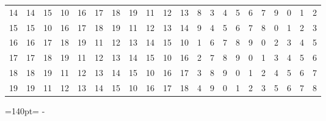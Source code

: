 \documentclass[10pt,a4paper]{article}
\newcommand{\needspace}[1]{\par\penalty-100\begingroup\dimen0=#1\relax\dimen2=\pagegoal
  \advance\dimen2-\pagetotal\ifdim\dimen0>\dimen2\relax\ifdim\dimen2>0pt\vfil\break\fi\fi
  \endgroup}
\numberwithin{equation}{section}
\begin{document}
{\begin{longtable}{@{}r|rrrrrrrrrrrrrrrrrrrr@{}}
14 & 14 & 15 & 10 & 16 & 17 & 18 & 19 & 11 & 12 & 13 & 8 & 3 & 4 & 5 & 6 & 7 & 9 & 0 & 1 & 2\\
15 & 15 & 10 & 16 & 17 & 18 & 19 & 11 & 12 & 13 & 14 & 9 & 4 & 5 & 6 & 7 & 8 & 0 & 1 & 2 & 3\\
16 & 16 & 17 & 18 & 19 & 11 & 12 & 13 & 14 & 15 & 10 & 1 & 6 & 7 & 8 & 9 & 0 & 2 & 3 & 4 & 5\\
17 & 17 & 18 & 19 & 11 & 12 & 13 & 14 & 15 & 10 & 16 & 2 & 7 & 8 & 9 & 0 & 1 & 3 & 4 & 5 & 6\\
18 & 18 & 19 & 11 & 12 & 13 & 14 & 15 & 10 & 16 & 17 & 3 & 8 & 9 & 0 & 1 & 2 & 4 & 5 & 6 & 7\\*
19 & 19 & 11 & 12 & 13 & 14 & 15 & 10 & 16 & 17 & 18 & 4 & 9 & 0 & 1 & 2 & 3 & 5 & 6 & 7 & 8\\
\bottomrule\end{longtable}}
\needspace{140pt}
\end{document}

